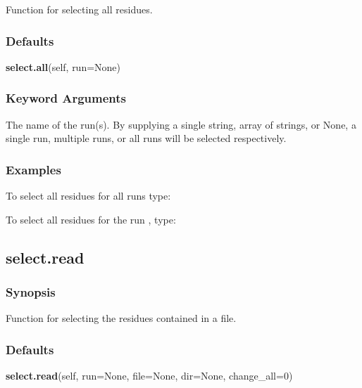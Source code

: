 Function for selecting all residues.



\subsubsection{Defaults}

\textsf{\textbf{select.all}(self, run=None)}


\subsubsection{Keyword Arguments}

  The name of the run(s).  By supplying a single string, array of strings, or None, a single run, multiple runs, or all runs will be selected respectively. 




\subsubsection{Examples}

To select all residues for all runs type:



To select all residues for the run , type:






\newpage

\subsection{select.read}


\subsubsection{Synopsis}

Function for selecting the residues contained in a file.



\subsubsection{Defaults}

\textsf{\textbf{select.read}(self, run=None, file=None, dir=None, change\_all=0)}


